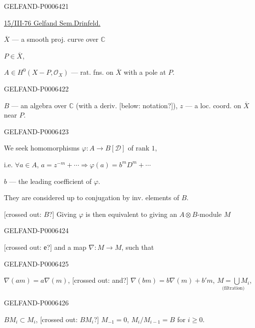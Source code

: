 \begin{GelfandAdjacentEvidence}{GELFAND-P000642}{1}
\noindent\textperiodcentered\hfill\textemdash\,\textperiodcentered\,\textemdash\par
\underline{15/III-76 }\quad \underline{Gelfand Sem.}\quad \underline{Drinfeld.}

\(\overline X\) --- a smooth proj. curve over \(\mathbb C\)

\(P\in\overline X\),

\(A\in H^0(X-P,\mathcal O_X)\) --- rat. fns. on \(\overline X\) with a pole at \(P\).
\end{GelfandAdjacentEvidence}
\begin{GelfandAdjacentEvidence}{GELFAND-P000642}{2}


\(B\) --- an algebra over \(\mathbb C\) (with a deriv. [below: notation?]),
\(z\) --- a loc. coord. on \(\overline X\) near \(P\).
\end{GelfandAdjacentEvidence}
\begin{GelfandAdjacentEvidence}{GELFAND-P000642}{3}


We seek homomorphisms \(\varphi:A\to B[\mathcal D]\) of rank \(1\),

i.e. \(\forall a\in A\), \(a=z^{-m}+\cdots\Rightarrow\varphi(a)=b^mD^m+\cdots\)

\(b\) --- the leading coefficient of \(\varphi\).

They are considered up to conjugation by inv. elements of \(B\).

[crossed out: \(B\)?] Giving \(\varphi\) is then equivalent to giving an
\(A\otimes B\)-module \(M\)
\end{GelfandAdjacentEvidence}
\begin{GelfandAdjacentEvidence}{GELFAND-P000642}{4}


[crossed out: е?] and a map \(\nabla:M\to M\), such that
\end{GelfandAdjacentEvidence}
\begin{GelfandAdjacentEvidence}{GELFAND-P000642}{5}


\(\nabla(am)=a\nabla(m)\), [crossed out: and?]
\(\nabla(bm)=b\nabla(m)+b'm\),
\(\underset{\text{(filtration)}}{M=\bigcup M_i}\),
\end{GelfandAdjacentEvidence}
\begin{GelfandAdjacentEvidence}{GELFAND-P000642}{6}


\(BM_i\subset M_i\), [crossed out: \(BM_i\)?]
\(M_{-1}=0\), \(M_i/M_{i-1}=B\) for \(i\geqslant0\).
\end{GelfandAdjacentEvidence}


